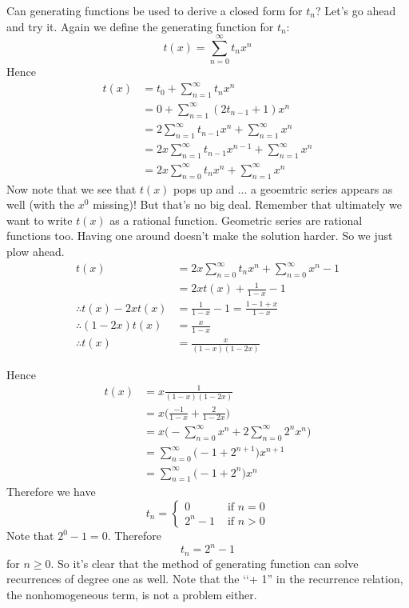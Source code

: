 Can generating functions be used to derive a closed form for $t_n$?
Let's go ahead and try it.
Again we define the generating function for $t_n$:
\[
t(x) = \sum_{n=0}^\infty t_n x^n
\]
Hence
\begin{align*}
t(x) 
&= t_0 + \sum_{n=1}^\infty t_n x^n \\
&= 0 + \sum_{n=1}^\infty (2t_{n-1} + 1) x^n \\
&= 2 \sum_{n=1}^\infty t_{n-1} x^n + \sum_{n=1}^\infty x^n \\
&= 2 x \sum_{n=1}^\infty t_{n-1} x^{n-1} + \sum_{n=1}^\infty x^n \\
&= 2 x \sum_{n=0}^\infty t_{n} x^{n} + \sum_{n=1}^\infty x^n 
\end{align*}
Now note that we see that $t(x)$ pops up and ... a geoemtric
series appears as well (with the $x^0$ missing)!
But that's no  big deal.
Remember that ultimately we want to write $t(x)$ as a rational
function.
Geometric series are rational functions too.
Having one around doesn't make the solution harder.
So we just plow ahead.
\begin{align*}
t(x) 
&= 2 x \sum_{n=0}^\infty t_{n} x^{n} + \sum_{n=0}^\infty x^n - 1\\
&= 2x t(x) + \frac{1}{1-x} - 1\\
\therefore
t(x) - 2x t(x)  
&= \frac{1}{1-x} - 1 = \frac{1-1+x}{1-x}\\
\therefore
(1 - 2x)t(x)  
&= \frac{x}{1-x}\\
\therefore
t(x)  
&= \frac{x}{(1-x)(1 - 2x)}
\end{align*}



Hence
\begin{align*}
t(x) 
&= x \frac{1}{(1-x)(1-2x)} \\
&= x \biggl( \frac{-1}{1-x} + \frac{2}{1-2x} \biggr) \\
&= x \biggl( -\sum_{n=0}^\infty x^n + 2 \sum_{n=0}^\infty 2^n x^n \biggr) \\
&= \sum_{n=0}^\infty \bigl ( -1 + 2^{n+1} \bigr )x^{n+1} \\
&= \sum_{n=1}^\infty \bigl ( -1 + 2^n \bigr )x^{n}
\end{align*}
Therefore we have
\[
t_n = 
\begin{cases}
0       &\text{ if } n = 0 \\
2^n - 1 &\text{ if } n > 0
\end{cases}
\]
Note that $2^0 - 1 = 0$. 
Therefore
\[
t_n = 2^n - 1
\]
for $n \geq 0$.
So it's clear that the method of generating function can solve
recurrences of degree one as well.
Note that the \lq\lq + 1'' in the recurrence relation, the nonhomogeneous term,
is not a problem either.

